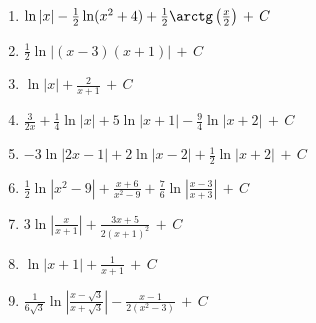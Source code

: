 \documentclass[12pt, letterpaper]{article}
\newcommand{\CC}{\,+\,C}
\begin{document}
\begin{enumerate}[leftmargin=*, label=\textbf{\arabic*.}, resume]
  \item $\ln|x| - \frac{1}{2}\ln(x^2+4) + \frac{1}{2}\arctg\left(\frac{x}{2}\right) \CC$
  \item $\frac{1}{2}\ln|(x-3)(x+1)| \CC$
  \item $\ln|x| + \frac{2}{x+1} \CC$
  \item $\frac{3}{2x} + \frac{1}{4}\ln|x| + 5\ln|x+1| - \frac{9}{4}\ln|x+2| \CC$
  \item $-3\ln|2x-1| + 2\ln|x-2| + \frac{1}{2}\ln|x+2| \CC$
  \item $\frac{1}{2}\ln|x^2-9| + \frac{x+6}{x^2-9} + \frac{7}{6}\ln\left|\frac{x-3}{x+3}\right| \CC$
  \item $3\ln\left|\frac{x}{x+1}\right| + \frac{3x+5}{2(x+1)^2} \CC$
  \item $\ln|x+1| + \frac{1}{x+1} \CC$
  \item $\frac{1}{6\sqrt{3}}\ln\left|\frac{x-\sqrt{3}}{x+\sqrt{3}}\right| - \frac{x-1}{2(x^2-3)} \CC$
\end{enumerate}

\fi
\end{document}
